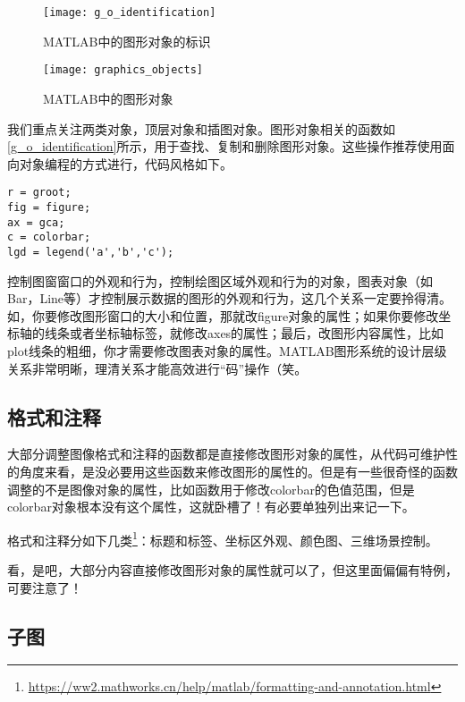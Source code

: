 \begin{figure}
    \centering
    \texttt{[image: g\_o\_identification]}
    \caption{MATLAB中的图形对象的标识}
    \label{g_o_identification}
\end{figure}

\begin{figure}
    \centering
    \texttt{[image: graphics\_objects]}
    \caption{MATLAB中的图形对象}
\end{figure}

我们重点关注两类对象，顶层对象和插图对象。图形对象相关的函数如\autoref{g_o_identification}所示，用于查找、复制和删除图形对象。这些操作推荐使用面向对象编程的方式进行，代码风格如下。

\begin{verbatim}
r = groot;
fig = figure;
ax = gca;
c = colorbar;
lgd = legend('a','b','c');
\end{verbatim}

控制图窗窗口的外观和行为，控制绘图区域外观和行为的对象，图表对象（如Bar，Line等）才控制展示数据的图形的外观和行为，这几个关系一定要拎得清。如，你要修改图形窗口的大小和位置，那就改figure对象的属性；如果你要修改坐标轴的线条或者坐标轴标签，就修改axes的属性；最后，改图形内容属性，比如plot线条的粗细，你才需要修改图表对象的属性。MATLAB图形系统的设计层级关系非常明晰，理清关系才能高效进行“码”操作（笑。

\subsection{格式和注释}

大部分调整图像格式和注释的函数都是直接修改图形对象的属性，从代码可维护性的角度来看，是没必要用这些函数来修改图形的属性的。但是有一些很奇怪的函数调整的不是图像对象的属性，比如函数用于修改colorbar的色值范围，但是colorbar对象根本没有这个属性，这就卧槽了！有必要单独列出来记一下。

格式和注释分如下几类\footnote{\url{https://ww2.mathworks.cn/help/matlab/formatting-and-annotation.html}}：标题和标签、坐标区外观、颜色图、三维场景控制。

看，是吧，大部分内容直接修改图形对象的属性就可以了，但这里面偏偏有特例，可要注意了！

\subsection{子图}

